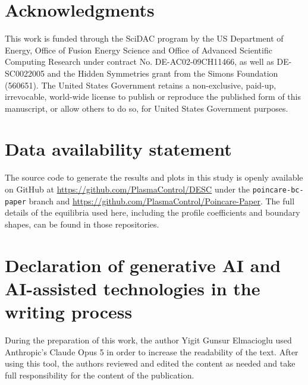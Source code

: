 \documentclass{jpp}
\begin{document}
\section{Acknowledgments}
This work is funded through the SciDAC program by the US Department of Energy, Office of Fusion Energy Science and Office of Advanced Scientific Computing Research under contract No. DE-AC02-09CH11466, as well as DE-SC0022005 and the Hidden Symmetries grant from the Simons Foundation (560651). The United States Government retains a non-exclusive, paid-up, irrevocable, world-wide license to publish or reproduce the published form of this manuscript, or allow others to do so, for United States Government purposes.


\section{Data availability statement}
The source code to generate the results and plots in this study is openly available on GitHub at \url{https://github.com/PlasmaControl/DESC} under the \texttt{poincare-bc-paper} branch and \url{https://github.com/PlasmaControl/Poincare-Paper}. The full details of the equilibria used here, including the profile coefficients and boundary shapes, can be found in those repositories.


\section{Declaration of generative AI and AI-assisted technologies in the writing process}
During the preparation of this work, the author Yigit Gunsur Elmacioglu used Anthropic's Claude Opus 5 in order to increase the readability of the text. After using this tool, the authors reviewed and edited the content as needed and take full responsibility for the content of the publication.

\appendix
\end{document}
